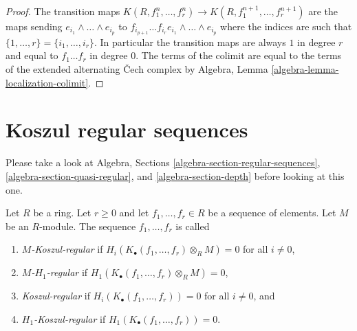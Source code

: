 \begin{proof}
The transition maps $K(R, f_1^n, \ldots, f_r^n) \to
K(R, f_1^{n + 1}, \ldots, f_r^{n + 1})$ are the maps
sending $e_{i_1} \wedge \ldots \wedge e_{i_p}$ to
$f_{i_{p + 1}} \ldots f_{i_r} e_{i_1} \wedge \ldots \wedge e_{i_p}$
where the indices are such that $\{1, \ldots, r\} = \{i_1, \ldots, i_r\}$.
In particular the transition maps are always $1$ in degree $r$
and equal to $f_1\ldots f_r$ in degree $0$.
The terms of the colimit are equal to the terms of the
extended alternating {\v C}ech complex by
Algebra, Lemma \ref{algebra-lemma-localization-colimit}.
\end{proof}




\section{Koszul regular sequences}
\label{section-koszul-regular}

\noindent
Please take a look at
Algebra, Sections \ref{algebra-section-regular-sequences},
\ref{algebra-section-quasi-regular}, and
\ref{algebra-section-depth}
before looking at this one.

\begin{definition}
\label{definition-koszul-regular-sequence}
Let $R$ be a ring. Let $r \geq 0$ and let $f_1, \ldots, f_r \in R$
be a sequence of elements. Let $M$ be an $R$-module.
The sequence $f_1, \ldots, f_r$ is called
\begin{enumerate}
\item {\it $M$-Koszul-regular} if
$H_i(K_\bullet(f_1, \ldots, f_r) \otimes_R M) = 0$ for
all $i \not = 0$,
\item {\it $M$-$H_1$-regular} if
$H_1(K_\bullet(f_1, \ldots, f_r) \otimes_R M) = 0$,
\item {\it Koszul-regular} if $H_i(K_\bullet(f_1, \ldots, f_r)) = 0$ for
all $i \not = 0$, and
\item {\it $H_1$-Koszul-regular} if $H_1(K_\bullet(f_1, \ldots, f_r)) = 0$.
\end{enumerate}
\end{definition}

